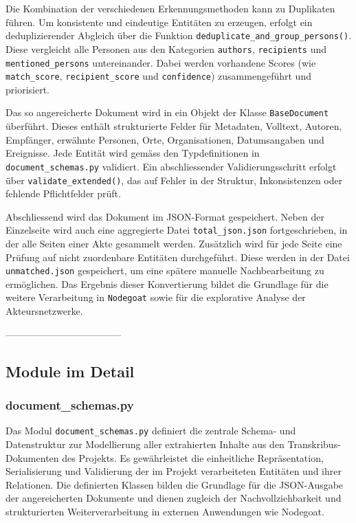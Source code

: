 \documentclass[12pt, a4paper, ngerman, bidi=default]{article}
\newcommand{\code}[1]{\colorbox{VeryLightGray}{\texttt{#1}}} %
\begin{document}
Die Kombination der verschiedenen Erkennungsmethoden kann zu Duplikaten führen. Um konsistente und eindeutige Entitäten zu erzeugen, 
erfolgt ein deduplizierender Abgleich über die Funktion \code{deduplicate\_and\_group\_persons()}. Diese vergleicht alle Personen 
aus den Kategorien \code{authors}, \code{recipients} und \code{mentioned\_persons} untereinander. Dabei werden vorhandene Scores 
(wie \code{match\_score}, \code{recipient\_score} und \code{confidence}) zusammengeführt und priorisiert.

Das so angereicherte Dokument wird in ein Objekt der Klasse \code{BaseDocument} überführt. Dieses enthält strukturierte Felder für 
Metadaten, Volltext, Autoren, Empfänger, erwähnte Personen, Orte, Organisationen, Datumsangaben und Ereignisse. Jede Entität wird gemäss 
den Typdefinitionen in \code{document\_schemas.py} validiert. Ein abschliessender Validierungsschritt erfolgt über 
\code{validate\_extended()}, das auf Fehler in der Struktur, Inkonsistenzen oder fehlende Pflichtfelder prüft.

Abschliessend wird das Dokument im JSON-Format gespeichert. Neben der Einzelseite wird auch eine aggregierte Datei 
\code{total\_json.json} fortgeschrieben, in der alle Seiten einer Akte gesammelt werden. Zusätzlich wird für jede Seite 
eine Prüfung auf nicht zuordenbare Entitäten durchgeführt. Diese werden in der Datei \code{unmatched.json} gespeichert, 
um eine spätere manuelle Nachbearbeitung zu ermöglichen. Das Ergebnis dieser Konvertierung bildet die Grundlage für die weitere 
Verarbeitung in \code{Nodegoat} sowie für die explorative Analyse der Akteursnetzwerke.

------------------------------------


\subsection{Module im Detail}\label{subsec:Module_im_Detail}
\subsubsection{document\_schemas.py}\label{subsec:document_schema}
Das Modul \code{document\_schemas.py} definiert die zentrale Schema- und Datenstruktur 
zur Modellierung aller extrahierten Inhalte aus den Transkribus-Dokumenten des Projekts. Es gewährleistet die einheitliche Repräsentation, 
Serialisierung und Validierung der im Projekt verarbeiteten Entitäten und ihrer Relationen. Die definierten Klassen bilden die Grundlage für die JSON-Ausgabe der angereicherten Dokumente und dienen zugleich der Nachvollziehbarkeit und strukturierten Weiterverarbeitung in externen Anwendungen wie Nodegoat.
\end{document}
